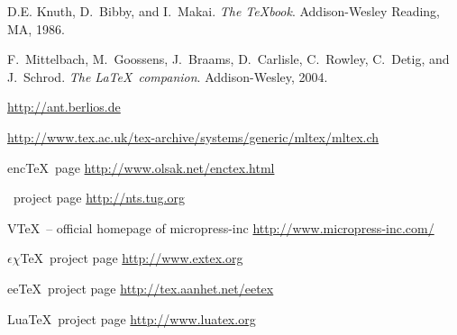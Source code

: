 \documentclass{scrartcl}
\begin{document}
\clearpage
\normalsize
\begin{thebibliography}{10}
\label{sec:refs}

	\vspace{2ex}
	\vspace{1ex}
	D.E. Knuth, D.~Bibby, and I.~Makai.
	\newblock \emph{{The \TeX book}}.
	\newblock Addison-Wesley Reading, MA, 1986.
	
	F.~Mittelbach, M.~Goossens, J.~Braams, D.~Carlisle, C.~Rowley, C.~Detig, and
	  J.~Schrod.
	\newblock \emph{{The \LaTeX\ companion}}.
	\newblock Addison-Wesley, 2004.
	
	\vspace{2ex}
	\vspace{1ex}
	\vspace{1ex}
	
	\newblock \url{http://ant.berlios.de}
	
	\newblock \url{http://www.tex.ac.uk/tex-archive/systems/generic/mltex/mltex.ch}
	
	{enc\TeX\ page}
	\newblock \url{http://www.olsak.net/enctex.html}
	
	{\NTS\ project page}
	\newblock \url{http://nts.tug.org}
	
	{V\TeX\ – official homepage of micropress-inc}
	\newblock \url{http://www.micropress-inc.com/}
	
	{$\epsilon\chi$\TeX\ project page}
	\newblock \url{http://www.extex.org}
	
	{ee\TeX\ project page}
	\newblock \url{http://tex.aanhet.net/eetex}
	
	{Lua\TeX\ project page}
	\newblock \url{http://www.luatex.org}
	

\end{thebibliography}
\end{document}

